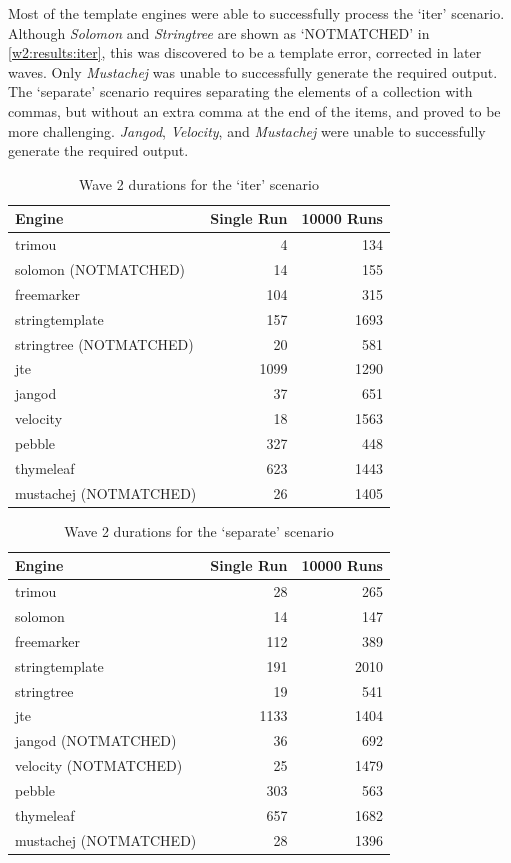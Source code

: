 Most of the template engines were able to successfully process the `iter' scenario. Although \emph{Solomon} and \emph{Stringtree} are shown as `NOTMATCHED' in \autoref{w2:results:iter}, this was discovered to be a template error, corrected in later waves. Only \emph{Mustachej} was unable to successfully generate the required output. The `separate' scenario requires separating the elements of a collection with commas, but without an extra comma at the end of the items, and proved to be more challenging. \emph{Jangod}, \emph{Velocity}, and \emph{Mustachej} were unable to successfully generate the required output.

\begin{table}[ht!]
\centering
\begin{tabular}{lrr}
\textbf{Engine} & \textbf{Single Run} & \textbf{10000 Runs} \\
\hline
trimou & 4 & 134 \\
solomon (NOTMATCHED) & 14 & 155\\
freemarker & 104 & 315 \\
stringtemplate & 157 & 1693\\
stringtree (NOTMATCHED) & 20 & 581 \\
jte & 1099 & 1290 \\
jangod & 37 & 651 \\
velocity & 18 & 1563 \\
pebble & 327 & 448 \\
thymeleaf & 623 & 1443 \\
mustachej (NOTMATCHED) & 26 & 1405 \\
\end{tabular}
\caption{Wave 2 durations for the `iter' scenario\label{w2:results:iter}}
\end{table}

\begin{table}[ht!]
\centering
\begin{tabular}{lrr}
\textbf{Engine} & \textbf{Single Run} & \textbf{10000 Runs} \\
\hline
trimou & 28 & 265 \\
solomon & 14 & 147 \\
freemarker & 112 & 389 \\
stringtemplate & 191 & 2010 \\
stringtree & 19 & 541 \\
jte & 1133 & 1404 \\
jangod (NOTMATCHED) & 36 & 692 \\
velocity (NOTMATCHED) & 25 & 1479 \\
pebble & 303 & 563 \\
thymeleaf & 657 & 1682 \\
mustachej (NOTMATCHED) & 28 & 1396 \\
\end{tabular}
\caption{Wave 2 durations for the `separate' scenario\label{w2:results:separate}}
\end{table}

